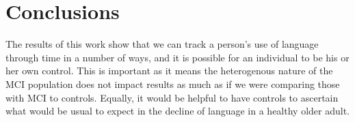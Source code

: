 \documentclass[12pt]{article}
\begin{document}
\section{Conclusions}\label{conclusions}
The results of this work show that we can track a person's use of language through time in a number of ways, and it is possible for an individual to be his or her own control. This is important as it means the heterogenous nature of the MCI population does not impact results as much as if we were comparing those with MCI to controls. Equally, it would be helpful to have controls to ascertain what would be usual to expect in the decline of language in a healthy older adult. 



\end{document}
